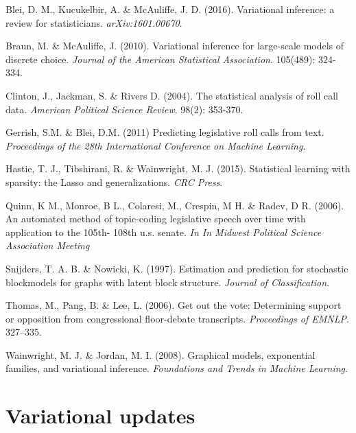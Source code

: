\documentclass{article}
\begin{document}
\begin{thebibliography}{10}

 Blei, D. M., Kucukelbir, A. \& McAuliffe, J. D. (2016). Variational inference: a review for statisticians. {\sl arXiv:1601.00670}.

 Braun, M. \& McAuliffe, J. (2010). Variational inference for large-scale models of discrete choice. {\itshape Journal of the American Statistical Association}. 105(489): 324-334. 

 Clinton, J., Jackman, S. \& Rivers D. (2004). The statistical analysis of roll call data. {\itshape American Political Science Review}. 98(2): 353-370. 

 Gerrish, S.M. \& Blei, D.M. (2011) Predicting legislative roll calls from text. {\it Proceedings of the 28th International Conference on Machine Learning}.

 Hastie, T. J., Tibshirani, R. \& Wainwright, M. J. (2015). Statistical learning with sparsity: the Lasso and generalizations. {\itshape CRC Press}. 

 Quinn, K M., Monroe, B L., Colaresi, M., Crespin, M H. \& Radev, D R. (2006). An automated method of topic-coding legislative
speech over time with application to the 105th-
108th u.s. senate. {\itshape In In Midwest Political Science
Association Meeting}

 Snijders, T. A. B. \& Nowicki, K. (1997). Estimation and prediction for stochastic blockmodels for graphs with latent block structure. {\itshape Journal of Classification}.

 Thomas, M., Pang, B. \& Lee, L. (2006). Get out
the vote: Determining support or opposition from
congressional floor-debate transcripts. {\itshape Proceedings
of EMNLP}. 327–335.

 Wainwright, M. J. \& Jordan, M. I. (2008). Graphical models, exponential families, and variational inference. {\sl Foundations and Trends in Machine Learning}. 

\end{thebibliography}

\appendix

\newpage

\section{Variational updates}
\end{document}
